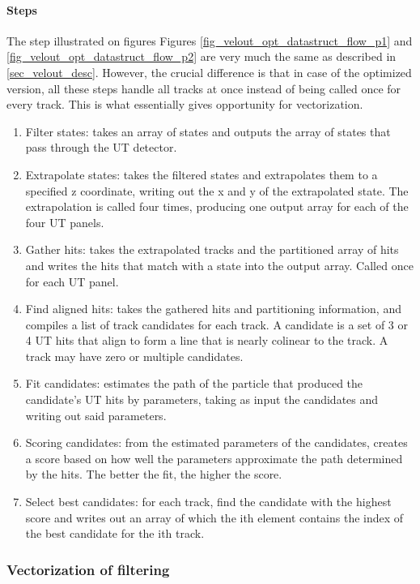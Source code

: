 \documentclass[12pt]{article}
\begin{document}
\paragraph{Steps} \mbox{}\vspace{0.4pc}

The step illustrated on figures Figures \ref{fig_velout_opt_datastruct_flow_p1} and \ref{fig_velout_opt_datastruct_flow_p2} are very much the same as described in \ref{sec_velout_desc}. However, the crucial difference is that in case of the optimized version, all these steps handle all tracks at once instead of being called once for every track. This is what essentially gives opportunity for vectorization.

\begin{enumerate}
	\item Filter states: takes an array of states and outputs the array of states that pass through the UT detector.
	\item Extrapolate states: takes the filtered states and extrapolates them to a specified z coordinate, writing out the x and y of the extrapolated state. The extrapolation is called four times, producing one output array for each of the four UT panels.
	\item Gather hits: takes the extrapolated tracks and the partitioned array of hits and writes the hits that match with a state into the output array. Called once for each UT panel.
	\item Find aligned hits: takes the gathered hits and partitioning information, and compiles a list of track candidates for each track. A candidate is a set of 3 or 4 UT hits that align to form a line that is nearly colinear to the track. A track may have zero or multiple candidates.
	\item Fit candidates: estimates the path of the particle that produced the candidate's UT hits by parameters, taking as input the candidates and writing out said parameters.
	\item Scoring candidates: from the estimated parameters of the candidates, creates a score based on how well the parameters approximate the path determined by the hits. The better the fit, the higher the score.
	\item Select best candidates: for each track, find the candidate with the highest score and writes out an array of which the ith element contains the index of the best candidate for the ith track.
\end{enumerate}


\subsubsection{Vectorization of filtering}\label{sec_velout_filtering_vect}
\end{document}
